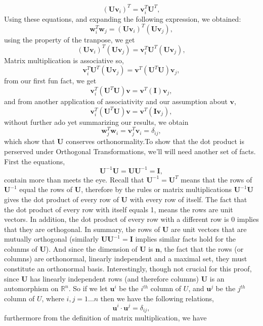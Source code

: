 \documentclass[10pt,showpacs,preprintnumbers,footinbib,amsmath,amssymb,aps,prl,twocolumn,groupedaddress,superscriptaddress,showkeys]{revtex4-1}
\begin{document}
\[
(\mathbf{U}\mathbf{v}_i)^T = \mathbf{v}_i^T\mathbf{U}^T,
\]
Using these equations, and expanding the following expression, we obtained:
\[
\mathbf{w}_i^T\mathbf{w}_j =(\mathbf{U}\mathbf{v}_i)^T(\mathbf{U}\mathbf{v}_j),
\]
using the property of the tranpose, we get
\[
(\mathbf{U}\mathbf{v}_i)^T(\mathbf{U}\mathbf{v}_j) = \mathbf{v}_i^T\mathbf{U}^T(\mathbf{U}\mathbf{v}_j),
\]
Matrix multiplication is associative so,
\[
\mathbf{v}_i^T\mathbf{U}^T(\mathbf{U}\mathbf{v}_j) = \mathbf{v}^T(\mathbf{U}^T\mathbf{U})\mathbf{v}_j,
\]
from our first fun fact, we get
\[
\mathbf{v}_i^T(\mathbf{U}^T\mathbf{U})\mathbf{v}=\mathbf{v}^T(\mathbf{I})\mathbf{v}_j,
\]
and from another application of associativity and our assumption about $\mathbf{v}$,
\[
\mathbf{v}_i^T(\mathbf{U}^T\mathbf{U})\mathbf{v}=\mathbf{v}^T(\mathbf{I}\mathbf{v}_j),
\]
without further ado yet summarizing our results, we obtain
\[
\mathbf{w}_j^T\mathbf{w}_i = \mathbf{v}_j^T\mathbf{v}_i = \delta_{ij},
\]
which show that $\mathbf{U}$ conserves orthonormality.\newline To show that the dot product is perserved under Orthogonal Transformations, we'll will need another set of facts. First the equations,
\[
\mathbf{U}^{-1} \mathbf{U}  =  \mathbf{U} \mathbf{U}^{-1} = \mathbf{I},
\]
contain more than meets the eye. Recall that  $\mathbf{U}^{-1} = \mathbf{U}^T$ means that the rows of $\mathbf{U}^{-1}$ equal the rows of $\mathbf{U}$, therefore by the rules or matrix multiplications $\mathbf{U}^{-1}\mathbf{U}$ gives the dot product of every row of $\mathbf{U}$  with every row of itself. The fact that the dot product of every row with itself equals 1, means the rows are unit vectors. In addition, the dot product of every row with a different row is 0 implies that they are orthogonal. In summary, the rows of $\mathbf{U}$ are unit vectors that are mutually orthogonal (similarly $\mathbf{U}\mathbf{U}^{-1} = \mathbf{I}$  implies similar facts hold for the colunms of $\mathbf{U}$). And since the dimension of $\mathbf{U}$ is $\mathbf{n}$, the fact that the rows (or columns) are orthonormal, linearly independent and a maximal set, they must constitute an orthonormal basis. Interestingly, though not crucial for this proof,  since $\mathbf{U}$ has linearly independent rows (and therefore columns) $\mathbf{U}$ is an automorphism on $\mathbb{R}^n$. So if we let $\mathbf{u}^i$ be the $i^{th}$ column of $U$, and $\mathbf{u}^j$ be the $j^{th}$ column of $U$, where $i,j = 1...n$ then we have the following relations,
\[
\mathbf{u}^i \cdot \mathbf{u}^j = \delta_{ij},
\]
furthermore from the definition of matrix multiplication, we have
\end{document}
